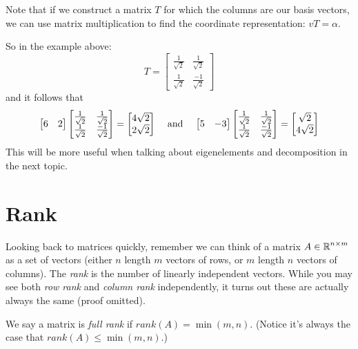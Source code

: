 \begin{aside}
Note that if we construct a matrix $T$ for which the columns are our basis vectors, 
we can use matrix multiplication to find the coordinate representation: $vT=\alpha$.
\vspace{2em}

So in the example above: 
\[T=\begin{bmatrix}\frac{1}{\sqrt{2}} & \frac{1}{\sqrt{2}} \\\frac{1}{\sqrt{2}} & \frac{-1}{\sqrt{2}}\end{bmatrix}\]
and it follows that 
\[
\begin{bmatrix}6 & 2\end{bmatrix}\begin{bmatrix}\frac{1}{\sqrt{2}} & \frac{1}{\sqrt{2}} \\\frac{1}{\sqrt{2}} & \frac{-1}{\sqrt{2}}\end{bmatrix} = \begin{bmatrix}4\sqrt{2}\\2\sqrt{2}\end{bmatrix}
\;\;\;\textnormal{ and }\;\;\;
\begin{bmatrix}5 & -3\end{bmatrix}\begin{bmatrix}\frac{1}{\sqrt{2}} & \frac{1}{\sqrt{2}} \\\frac{1}{\sqrt{2}} & \frac{-1}{\sqrt{2}}\end{bmatrix} = \begin{bmatrix}\sqrt{2}\\4\sqrt{2}\end{bmatrix}
\]
This will be more useful when talking about eigenelements and decomposition in the next topic. 
\end{aside}

\section{Rank}
Looking back to matrices quickly,
remember we can think of a matrix $A\in\operatorname{\mathbb{R}}^{n\times m}$ as a set of vectors (either $n$ length $m$ vectors of rows, or $m$ length $n$ vectors of columns). 
The \emph{rank} is the number of linearly independent vectors. 
While you may see both \textit{row rank} and \textit{column rank} independently, 
it turns out these are actually always the same (proof omitted). 

We say a matrix is \emph{full rank} if $rank(A)=\min(m,n)$. (Notice it's always the case that $rank(A)\le\min(m,n)$.)

